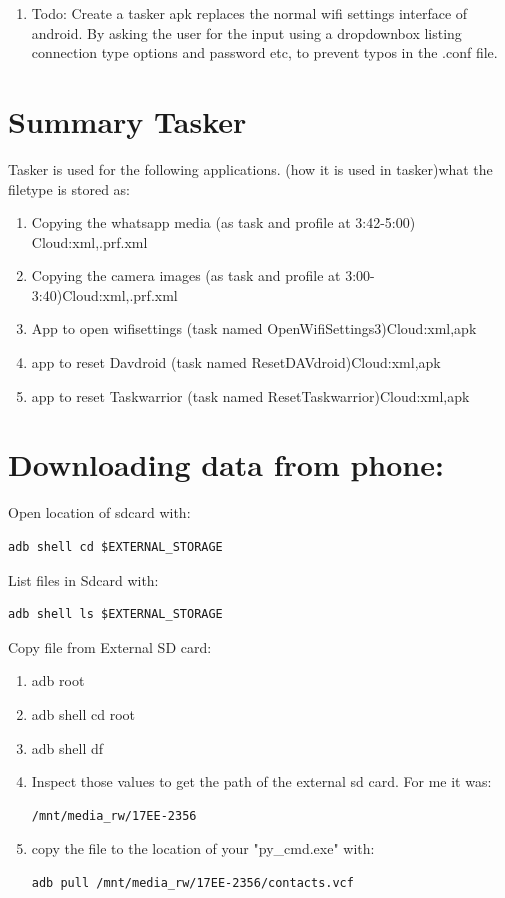 \begin{enumerate}
\begin{itemize}
    \end{itemize}
    \item Todo: Create a tasker apk replaces the normal wifi settings interface of android. By asking the user for the input using a dropdownbox listing connection type options and password etc, to prevent typos in the .conf file. 
\end{enumerate}

\section{Summary Tasker}
Tasker is used for the following applications. (how it is used in tasker){what the filetype is stored as}:
\begin{enumerate}
    \item Copying the whatsapp media (as task and profile at 3:42-5:00) {Cloud:xml,.prf.xml}
    \item Copying the camera images (as task and profile at 3:00-3:40){Cloud:xml,.prf.xml}
    \item App to open wifisettings (task named OpenWifiSettings3){Cloud:xml,apk}
    \item app to reset Davdroid (task named ResetDAVdroid){Cloud:xml,apk}
    \item app to reset Taskwarrior (task named ResetTaskwarrior){Cloud:xml,apk}
\end{enumerate}

\section{Downloading data from phone:}
Open location of sdcard with: 
\begin{verbatim}
adb shell cd $EXTERNAL_STORAGE    
\end{verbatim}
List files in Sdcard with:
\begin{verbatim}
adb shell ls $EXTERNAL_STORAGE    
\end{verbatim}
Copy file from External SD card:
\begin{enumerate}
    \item adb root
    \item adb shell cd root
    \item adb shell df
    \item Inspect those values to get the path of the external sd card. For me it was:
\begin{verbatim}
/mnt/media_rw/17EE-2356
\end{verbatim}
    \item copy the file to the location of your "py\_cmd.exe" with:
\begin{verbatim}
adb pull /mnt/media_rw/17EE-2356/contacts.vcf
\end{verbatim}
\end{enumerate}

